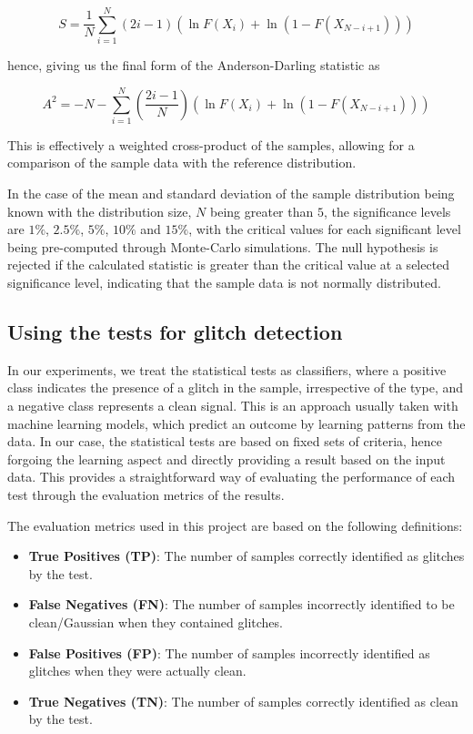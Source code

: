 \documentclass[12pt]{article}
\begin{document}
\begin{equation}
  S =  \frac{1}{N} \sum\limits_{i=1}^{N} \left( 2i - 1 \right) \left( \ln F(X_i) + \ln (1 - F(X_{N-i+1})) \right)
  \label{eq:ad_statistic_full}
\end{equation}

\medskip
\noindent hence, giving us the final form of the Anderson-Darling statistic as

\begin{equation}
  A^2 = -N - \sum\limits_{i=1}^{N} \left( \frac{2i - 1}{N} \right) \left( \ln F(X_i) + \ln (1 - F(X_{N-i+1})) \right)
  \label{eq:ad_statistic_full}
\end{equation}

\noindent This is effectively a weighted cross-product of the samples, allowing for a comparison of the sample data with the reference distribution.

\medskip
\noindent In the case of the mean and standard deviation of the sample distribution being known with the distribution size, $N$ being greater than $5$, the significance levels are $1\%$, $2.5\%$, $5\%$, $10\%$ and $15\%$, with the critical values for each significant level being pre-computed through Monte-Carlo simulations. The null hypothesis is rejected if the calculated statistic is greater than the critical value at a selected significance level, indicating that the sample data is not normally distributed.

\subsection{Using the tests for glitch detection}\label{UsingTests}

In our experiments, we treat the statistical tests as classifiers, where a positive class indicates the presence of a glitch in the sample, irrespective of the type, and a negative class represents a clean signal. This is an approach usually taken with machine learning models, which predict an outcome by learning patterns from the data. In our case, the statistical tests are based on fixed sets of criteria, hence forgoing the learning aspect and directly providing a result based on the input data. This provides a straightforward way of evaluating the performance of each test through the evaluation metrics of the results.

\medskip
\noindent The evaluation metrics used in this project are based on the following definitions:

\begin{itemize}
  \item \textbf{True Positives (TP)}: The number of samples correctly identified as glitches by the test.
  \item \textbf{False Negatives (FN)}: The number of samples incorrectly identified to be clean/Gaussian when they contained glitches.
  \item \textbf{False Positives (FP)}: The number of samples incorrectly identified as glitches when they were actually clean.
  \item \textbf{True Negatives (TN)}: The number of samples correctly identified as clean by the test.
\end{itemize}
\end{document}

